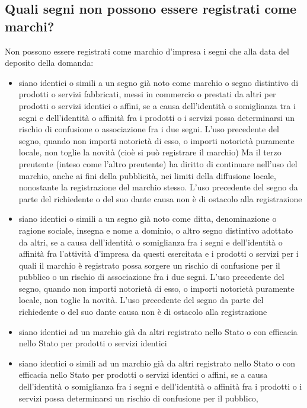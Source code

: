 \subsection{Quali segni non possono essere registrati come marchi?}
Non possono essere registrati come marchio d'impresa i segni che alla data del deposito della domanda:
\begin{itemize}
    \item siano identici o simili a un segno già noto come marchio o segno distintivo di prodotti o servizi
    fabbricati, messi in commercio o prestati da altri per prodotti o servizi identici o affini, se a causa dell'identità o somiglianza tra i segni
    e dell'identità o affinità fra i prodotti o i servizi possa determinarsi un rischio di confusione o associazione fra i due segni.\newline
    L'uso precedente del segno, quando non importi notorietà di esso, o importi notorietà puramente locale, non toglie la novità (cioè si può registrare il marchio)
    Ma il terzo preutente (inteso come l'altro preutente) ha diritto di continuare nell'uso del marchio, anche ai fini della pubblicità, nei limiti
    della diffusione locale, nonostante la registrazione del marchio stesso. L'uso precedente del segno da parte
    del richiedente o del suo dante causa non è di ostacolo alla registrazione
    \item siano identici o simili a un segno già noto come ditta, denominazione o ragione sociale, insegna e nome a dominio, o altro segno distintivo adottato
    da altri, se a causa dell'identità o somiglianza fra i segni e dell'identità o affinità fra l'attività d'impresa da questi esercitata e i prodotti o servizi per i quali
    il marchio è registrato possa sorgere un rischio di confusione per il pubblico o un rischio di associazione fra i due segni.\newline
    L'uso precedente del segno, quando non importi notorietà di esso, o importi notorietà puramente locale, non toglie la novità. L'uso precedente del segno da parte del richiedente
    o del suo dante causa non è di ostacolo alla registrazione
    \item siano identici ad un marchio già da altri registrato nello Stato o con efficacia nello Stato per prodotti o servizi identici
    \item siano identici o simili ad un marchio già da altri registrato nello Stato o con efficacia nello Stato per prodotti o servizi identici
    o affini, se a causa dell'identità o somiglianza fra i segni e dell'identità o affinità fra i prodotti o i servizi possa determinarsi un rischio di confusione per il pubblico,

\end{itemize}
